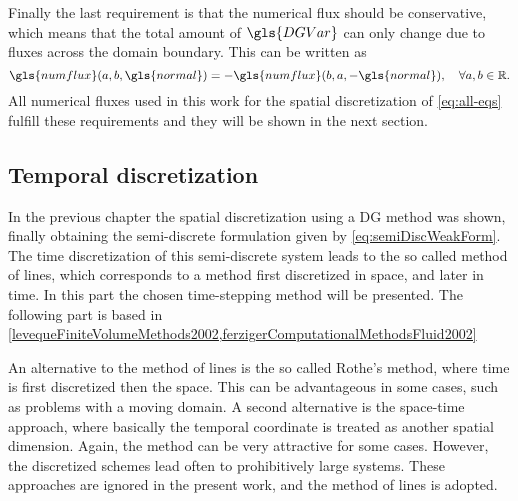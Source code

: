 Finally the last requirement is that the numerical flux should be conservative, which means that the total amount of $\gls{DGVar}$ can only change due to fluxes across the domain boundary. This can be written as
\begin{equation}
	\gls{numflux}(a,b,\gls{normal}) = 	-\gls{numflux}(b,a,-\gls{normal}), \quad \forall a,b \in \mathbb{R}. 
	\label{eq:conservativity}
\end{equation}
All numerical fluxes used in this work for the spatial discretization of \cref{eq:all-eqs} fulfill these requirements and they will be shown in the next section.
\subsection{Temporal discretization}\label{ssec:TemporalDiscretization}
In the previous chapter the spatial discretization using a DG method was shown, finally obtaining the semi-discrete formulation given by \cref{eq:semiDiscWeakForm}. The time discretization of this semi-discrete system leads to the so called method of lines, which corresponds to a method first discretized in space, and later in time. In this part the chosen time-stepping method will be presented. The following part is based in \cref{levequeFiniteVolumeMethods2002,ferzigerComputationalMethodsFluid2002}

An alternative to the method of lines is the so called Rothe's method, where time is first discretized then the space. This can be advantageous in some cases, such as problems with a moving domain. A second alternative is the space-time approach, where basically the temporal coordinate is treated as another spatial dimension. Again, the method can be very attractive for some cases. However, the discretized schemes lead often to prohibitively large systems. These approaches are ignored in the present work, and the method of lines is adopted.



